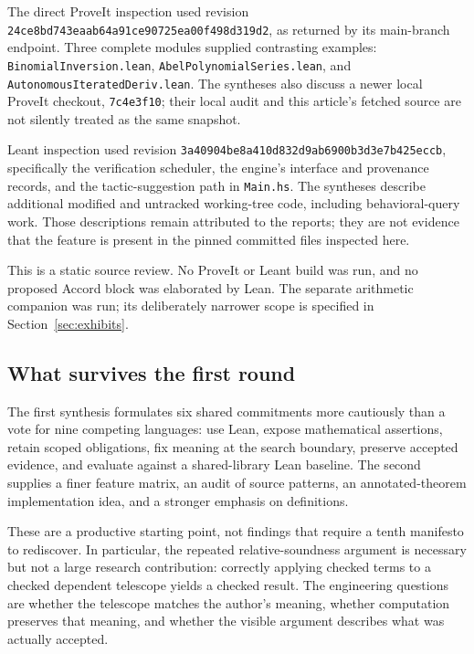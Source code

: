 \documentclass[11pt,letterpaper]{article}
\newcommand{\code}[1]{\nolinkurl{#1}}
\theoremstyle{definition}
\begin{document}
The direct ProveIt inspection used revision
\code{24ce8bd743eaab64a91ce90725ea00f498d319d2}, as returned by its main-branch
endpoint. Three complete modules supplied contrasting examples:
\code{BinomialInversion.lean}, \code{AbelPolynomialSeries.lean}, and
\code{AutonomousIteratedDeriv.lean}\cite{pbinomial,pabel,pode}.
The syntheses also discuss a newer local ProveIt checkout, \code{7c4e3f10}; their
local audit and this article's fetched source are not silently treated as the same
snapshot.

Leant inspection used revision
\code{3a40904be8a410d832d9ab6900b3d3e7b425eccb}, specifically the verification
scheduler, the engine's interface and provenance records, and the tactic-suggestion
path in \code{Main.hs}\cite{lverification,lengine,lmain}. The syntheses describe
additional modified and untracked working-tree code, including behavioral-query
work. Those descriptions remain attributed to the reports; they are not evidence
that the feature is present in the pinned committed files inspected here.

This is a static source review. No ProveIt or Leant build was run, and no proposed
Accord block was elaborated by Lean. The separate arithmetic companion was run;
its deliberately narrower scope is specified in Section~\ref{sec:exhibits}.

\subsection{What survives the first round}
The first synthesis formulates six shared commitments more cautiously than a vote
for nine competing languages: use Lean, expose mathematical assertions, retain
scoped obligations, fix meaning at the search boundary, preserve accepted evidence,
and evaluate against a shared-library Lean baseline. The second supplies a finer
feature matrix, an audit of source patterns, an annotated-theorem implementation
idea, and a stronger emphasis on definitions\cite{synthesis,review}.

These are a productive starting point, not findings that require a tenth manifesto
to rediscover. In particular, the repeated relative-soundness argument is necessary
but not a large research contribution: correctly applying checked terms to a
checked dependent telescope yields a checked result. The engineering questions
are whether the telescope matches the author's meaning, whether computation
preserves that meaning, and whether the visible argument describes what was
actually accepted.
\end{document}
